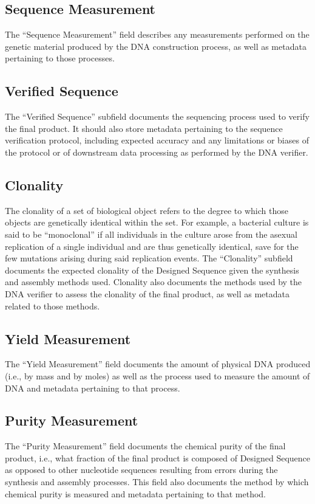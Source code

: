 \documentclass[12pt,letterpaper,english]{article}
\begin{document}
\subsection{Sequence Measurement}
The “Sequence Measurement” field describes any measurements performed on the genetic material produced by the DNA construction process, as well as metadata pertaining to those processes. \par

\subsection{Verified Sequence}
The “Verified Sequence” subfield documents the sequencing process used to verify the final product. It should also store metadata pertaining to the sequence verification protocol, including expected accuracy and any limitations or biases of the protocol or of downstream data processing as performed by the DNA verifier. \par

\subsection{Clonality}
The clonality of a set of biological object refers to the degree to which those objects are genetically identical within the set. For example, a bacterial culture is said to be “monoclonal” if all individuals in the culture arose from the asexual replication of a single individual and are thus genetically identical, save for the few mutations arising during said replication events. The “Clonality” subfield documents the expected clonality of the Designed Sequence given the synthesis and assembly methods used. Clonality also documents the methods used by the DNA verifier to assess the clonality of the final product, as well as metadata related to those methods. \par

\subsection{Yield Measurement}
The “Yield Measurement” field documents the amount of physical DNA produced (i.e., by mass and by moles) as well as the process used to measure the amount of DNA and metadata pertaining to that process. \par

\subsection{Purity Measurement}
The “Purity Measurement” field documents the chemical purity of the final product, i.e., what fraction of the final product is composed of Designed Sequence as opposed to other nucleotide sequences resulting from errors during the synthesis and assembly processes. This field also documents the method by which chemical purity is measured and metadata pertaining to that method. \par
\end{document}
